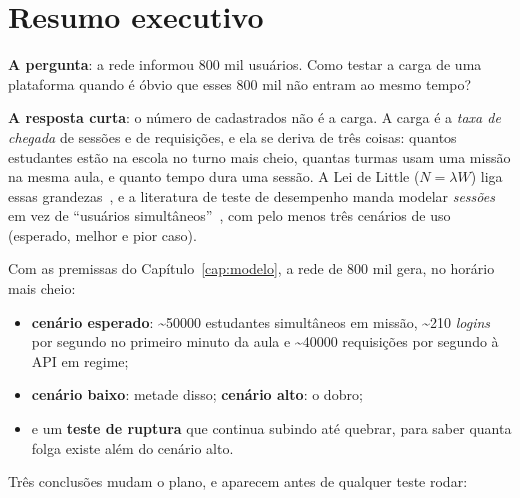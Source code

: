 \documentclass[11pt, a4paper, oneside, openany]{report}
\begin{document}
\chapter{Resumo executivo}

\textbf{A pergunta}: a rede informou 800 mil usuários. Como testar a carga de
uma plataforma quando é óbvio que esses 800 mil não entram ao mesmo tempo?

\textbf{A resposta curta}: o número de cadastrados não é a carga. A carga é a
\emph{taxa de chegada} de sessões e de requisições, e ela se deriva de três
coisas: quantos estudantes estão na escola no turno mais cheio, quantas turmas
usam uma missão na mesma aula, e quanto tempo dura uma sessão. A Lei de Little
($N = \lambda W$) liga essas grandezas~\cite{little1961}, e a literatura de
teste de desempenho manda modelar \emph{sessões} em vez de \enquote{usuários
simultâneos}~\cite{meier2007cap12}, com pelo menos três cenários de uso (esperado,
melhor e pior caso).

\begin{destaque}
Com as premissas do Capítulo~\ref{cap:modelo}, a rede de 800 mil gera, no
horário mais cheio:
\begin{itemize}[nosep]
  \item \textbf{cenário esperado}: \textasciitilde\num{50000} estudantes
    simultâneos em missão, \textasciitilde210 \emph{logins} por segundo no
    primeiro minuto da aula e \textasciitilde\num{40000} requisições por segundo
    à API em regime;
  \item \textbf{cenário baixo}: metade disso; \textbf{cenário alto}: o dobro;
  \item e um \textbf{teste de ruptura} que continua subindo até quebrar, para
    saber quanta folga existe além do cenário alto.
\end{itemize}
\end{destaque}

Três conclusões mudam o plano, e aparecem antes de qualquer teste rodar:
\end{document}
